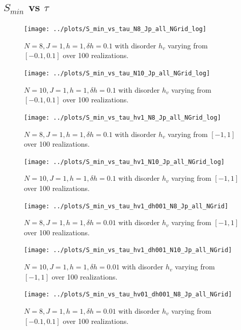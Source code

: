 \documentclass[a4paper]{article}
\begin{document}
\subsection{$S_{min}$ vs $\tau$}
\begin{figure}[h!]
  \centering
  \texttt{[image: ../plots/S\_min\_vs\_tau\_N8\_Jp\_all\_NGrid\_log]}
  \caption{$N = 8, J = 1, h = 1, \delta h=0.1$ with disorder $h_v$ varying from $[-0.1,0.1]$ over 100 realizations.}
  \label{fig:}
\end{figure}

\begin{figure}[h!]
  \centering
  \texttt{[image: ../plots/S\_min\_vs\_tau\_N10\_Jp\_all\_NGrid\_log]}
  \caption{$N = 10, J = 1, h = 1, \delta h=0.1$ with disorder $h_v$ varying from $[-0.1,0.1]$ over 100 realizations.}
  \label{fig:}
\end{figure}

\begin{figure}[h!]
  \centering
  \texttt{[image: ../plots/S\_min\_vs\_tau\_hv1\_N8\_Jp\_all\_NGrid\_log]}
  \caption{$N = 8, J = 1, h = 1, \delta h=0.1$ with disorder $h_v$ varying from $[-1,1]$ over 100 realizations.}
  \label{fig:}
\end{figure}

\begin{figure}[h!]
  \centering
  \texttt{[image: ../plots/S\_min\_vs\_tau\_hv1\_N10\_Jp\_all\_NGrid\_log]}
  \caption{$N = 10, J = 1, h = 1, \delta h=0.1$ with disorder $h_v$ varying from $[-1,1]$ over 100 realizations.}
  \label{fig:}
\end{figure}

\begin{figure}[h!]
  \centering
  \texttt{[image: ../plots/S\_min\_vs\_tau\_hv1\_dh001\_N8\_Jp\_all\_NGrid]}
  \caption{$N = 8, J = 1, h = 1, \delta h=0.01$ with disorder $h_v$ varying from $[-1,1]$ over 100 realizations.}
  \label{fig:}
\end{figure}

\begin{figure}[h!]
  \centering
  \texttt{[image: ../plots/S\_min\_vs\_tau\_hv1\_dh001\_N10\_Jp\_all\_NGrid]}
  \caption{$N = 10, J = 1, h = 1, \delta h=0.01$ with disorder $h_v$ varying from $[-1,1]$ over 100 realizations.}
  \label{fig:}
\end{figure}

\begin{figure}[h!]
  \centering
  \texttt{[image: ../plots/S\_min\_vs\_tau\_hv01\_dh001\_N8\_Jp\_all\_NGrid]}
  \caption{$N = 8, J = 1, h = 1, \delta h=0.01$ with disorder $h_v$ varying from $[-0.1,0.1]$ over 100 realizations.}
  \label{fig:}
\end{figure}
\end{document}
